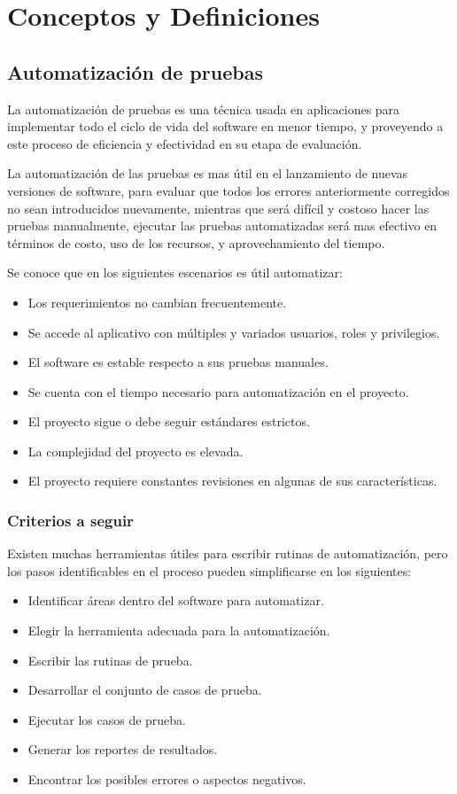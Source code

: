 \chapter{Conceptos y Definiciones}

\section{Automatización de pruebas}
La automatización de pruebas es una técnica usada en aplicaciones para
implementar todo el ciclo de vida del software en menor tiempo, y proveyendo a
este proceso de eficiencia y efectividad en su etapa de evaluación.

La automatización de las pruebas es mas útil en el lanzamiento de nuevas
versiones de software, para evaluar que todos los errores anteriormente
corregidos no sean introducidos nuevamente, mientras que será difícil y costoso
hacer las pruebas manualmente, ejecutar las pruebas automatizadas será mas
efectivo en términos de costo, uso de los recursos, y aprovechamiento del
tiempo.

Se conoce que en los siguientes escenarios es útil automatizar:

\begin{itemize}
    \item Los requerimientos no cambian frecuentemente.
    \item Se accede al aplicativo con múltiples y variados usuarios, roles y
        privilegios.
    \item El software es estable respecto a sus pruebas manuales.
    \item Se cuenta con el tiempo necesario para automatización en el proyecto.
    \item El proyecto sigue o debe seguir estándares estrictos.
    \item La complejidad del proyecto es elevada.
    \item El proyecto requiere constantes revisiones en algunas de sus
    características.
\end{itemize}

\subsection{Criterios a seguir}
Existen muchas herramientas útiles para escribir rutinas de automatización, pero
los pasos identificables en el proceso pueden simplificarse en los siguientes:

\begin{itemize}
    \item Identificar áreas dentro del software para automatizar.
    \item Elegir la herramienta adecuada para la automatización.
    \item Escribir las rutinas de prueba.
    \item Desarrollar el conjunto de casos de prueba.
    \item Ejecutar los casos de prueba.
    \item Generar los reportes de resultados.
    \item Encontrar los posibles errores o aspectos negativos.
\end{itemize}

